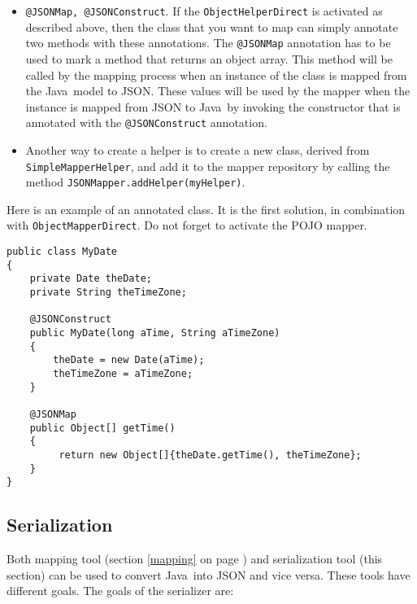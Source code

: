 \documentclass[a4paper]{article}
\newcommand{\java}{Java}
\begin{document}
\begin{itemize}
   \item \lstinline{@JSONMap, @JSONConstruct}. If the \lstinline{ObjectHelperDirect} is activated as described above, then the class that you want to map can simply annotate two methods with these annotations. The \lstinline{@JSONMap} annotation has to be used to mark a method that returns an object array. This method will be called by the mapping process when an instance of the class is mapped from the \java\ model to JSON. These values will be used by the mapper when the instance is mapped from JSON to \java\ by invoking the constructor that is annotated with the \lstinline{@JSONConstruct} annotation.
   \item Another way to create a helper is to create a new class, derived from \lstinline{SimpleMapperHelper}, and add it to the mapper repository by calling the method \lstinline{JSONMapper.addHelper(myHelper)}.
\end{itemize}

Here is an example of an annotated class. It is the first solution, in combination with \lstinline{ObjectMapperDirect}. Do not forget to activate the POJO mapper.

\medskip
\begin{lstlisting}
public class MyDate
{
    private Date theDate;
    private String theTimeZone;

    @JSONConstruct
    public MyDate(long aTime, String aTimeZone)
    {
        theDate = new Date(aTime);
        theTimeZone = aTimeZone;
    }

    @JSONMap
    public Object[] getTime()
    {
         return new Object[]{theDate.getTime(), theTimeZone};
    }
}
\end{lstlisting}


\subsection{Serialization}
\label{serialization}

Both mapping tool (section \ref{mapping} on page \pageref{mapping})  and serialization tool (this section) can be used to convert \java\ into JSON and vice versa. These tools have different goals. The goals of the serializer are:
\end{document}
